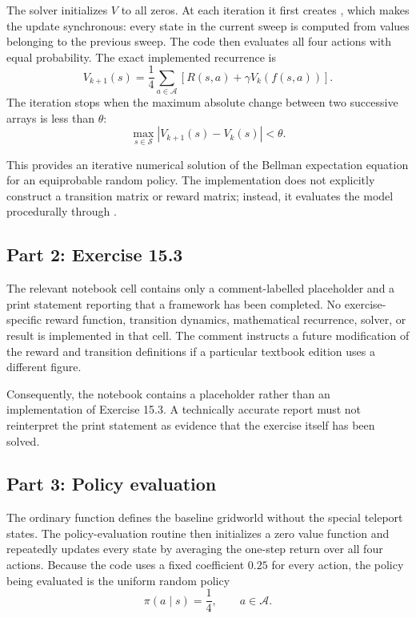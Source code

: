 \documentclass[11pt,a4paper]{article}
\newcommand{\code}[1]{\texttt{\detokenize{#1}}}
\begin{document}
The solver initializes \(V\) to all zeros. At each iteration it first creates \code{old = V.copy()}, which makes the update synchronous: every state in the current sweep is computed from values belonging to the previous sweep. The code then evaluates all four actions with equal probability. The exact implemented recurrence is
\begin{equation}
V_{k+1}(s)
=\frac{1}{4}\sum_{a\in\mathcal{A}}
\left[R(s,a)+\gamma V_k(f(s,a))\right].
\end{equation}
The iteration stops when the maximum absolute change between two successive arrays is less than \(\theta\):
\begin{equation}
\max_{s\in\mathcal{S}}|V_{k+1}(s)-V_k(s)|<\theta.
\end{equation}

This provides an iterative numerical solution of the Bellman expectation equation for an equiprobable random policy. The implementation does not explicitly construct a transition matrix or reward matrix; instead, it evaluates the model procedurally through \code{part1\_transition}.

\subsection{Part 2: Exercise 15.3}
The relevant notebook cell contains only a comment-labelled placeholder and a print statement reporting that a framework has been completed. No exercise-specific reward function, transition dynamics, mathematical recurrence, solver, or result is implemented in that cell. The comment instructs a future modification of the reward and transition definitions if a particular textbook edition uses a different figure.

Consequently, the notebook contains a placeholder rather than an implementation of Exercise 15.3. A technically accurate report must not reinterpret the print statement as evidence that the exercise itself has been solved.

\subsection{Part 3: Policy evaluation}
The ordinary \code{transition} function defines the baseline gridworld without the special teleport states. The policy-evaluation routine then initializes a zero value function and repeatedly updates every state by averaging the one-step return over all four actions. Because the code uses a fixed coefficient \(0.25\) for every action, the policy being evaluated is the uniform random policy
\begin{equation}
\pi(a\mid s)=\frac{1}{4},
\qquad a\in\mathcal{A}.
\end{equation}
\end{document}
